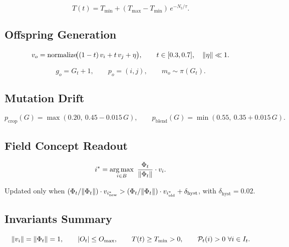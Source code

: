 \documentclass[12pt, a4paper]{article}
\DeclareMathOperator*{\argmax}{arg\,max}
\DeclarePairedDelimiter{\norm}{\lVert}{\rVert}
\theoremstyle{definition}
\begin{document}
\begin{equation}
T(t) = T_{\min} + (T_{\max} - T_{\min})\,e^{-N_t/\tau}.
\end{equation}

\subsection{Offspring Generation}

\begin{equation}
v_o = \operatorname{normalize}\!\bigl((1-t)\,v_i + t\,v_j + \eta\bigr), \qquad t \in [0.3, 0.7],\quad \norm{\eta} \ll 1.
\end{equation}

\begin{equation}
g_o = G_t + 1, \qquad p_o = (i, j), \qquad m_o \sim \pi(G_t).
\end{equation}

\subsection{Mutation Drift}

\begin{equation}
p_{\mathrm{crop}}(G) = \max(0.20,\ 0.45 - 0.015\,G), \qquad p_{\mathrm{blend}}(G) = \min(0.55,\ 0.35 + 0.015\,G).
\end{equation}

\subsection{Field Concept Readout}

\begin{equation}
i^* = \argmax_{i \in B}\ \frac{\Phi_t}{\norm{\Phi_t}} \cdot v_i.
\end{equation}

Updated only when $(\Phi_t / \norm{\Phi_t}) \cdot v_{i^*_{\mathrm{new}}} > (\Phi_t / \norm{\Phi_t}) \cdot v_{i^*_{\mathrm{old}}} + \delta_{\mathrm{hyst}}$, with $\delta_{\mathrm{hyst}} = 0.02$.

\subsection{Invariants Summary}

\begin{equation}
\norm{v_i} = \norm{\Phi_t} = 1, \qquad |O_t| \le O_{\max}, \qquad T(t) \ge T_{\min} > 0, \qquad \mathcal{P}_t(i) > 0\ \forall i \in I_t.
\end{equation}
\end{document}
